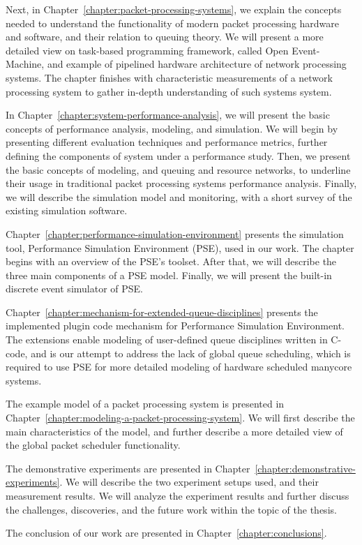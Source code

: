 Next, in Chapter~\ref{chapter:packet-processing-systems}, we explain the concepts needed to understand the functionality of modern packet processing hardware and software, and their relation to queuing theory. We will present a more detailed view on task-based programming framework, called Open Event-Machine, and example of pipelined hardware architecture of network processing systems. The chapter finishes with characteristic measurements of a network processing system to gather in-depth understanding of such systems system.

In Chapter~\ref{chapter:system-performance-analysis}, we will present the basic concepts of performance analysis, modeling, and simulation. We will begin by presenting different evaluation techniques and performance metrics, further defining the components of system under a performance study. Then, we present the basic concepts of modeling, and queuing and resource networks, to underline their usage in traditional packet processing systems performance analysis. Finally, we will describe the simulation model and monitoring, with a short survey of the existing simulation software.

Chapter~\ref{chapter:performance-simulation-environment} presents the simulation tool, Performance Simulation Environment (PSE), used in our work. The chapter begins with an overview of the PSE's toolset. After that, we will describe the three main components of a PSE model. Finally, we will present the built-in discrete event simulator of PSE.

Chapter~\ref{chapter:mechanism-for-extended-queue-disciplines} presents the implemented plugin code mechanism for Performance Simulation Environment. The extensions enable modeling of user-defined queue disciplines written in C-code, and is our attempt to address the lack of global queue scheduling, which is required to use PSE for more detailed modeling of hardware scheduled manycore systems.

The example model of a packet processing system is presented in Chapter~\ref{chapter:modeling-a-packet-processing-system}. We will first describe the main characteristics of the model, and further describe a more detailed view of the global packet scheduler functionality.

The demonstrative experiments are presented in Chapter~\ref{chapter:demonstrative-experiments}. We will describe the two experiment setups used, and their measurement results. We will analyze the experiment results and further discuss the challenges, discoveries, and the future work within the topic of the thesis.

The conclusion of our work are presented in Chapter~\ref{chapter:conclusions}.

